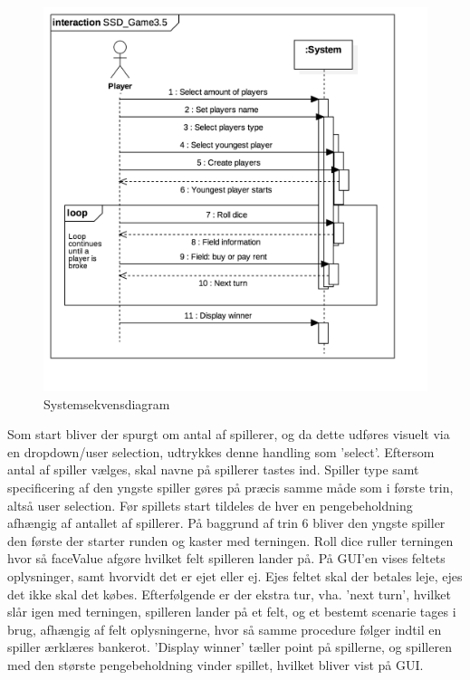 \begin{figure}[H]
    \begin{center}
        \includegraphics[width=13cm]{graphics/domain/SSD_Game3nw.png}
        \caption{Systemsekvensdiagram}
        \label{fig:systemsekvens_diagram}
    \end{center}
\end{figure}

\noindent Som start bliver der spurgt om antal af spillerer, og da dette udføres visuelt via en dropdown/user selection, udtrykkes denne handling som 'select'.
Eftersom antal af spiller vælges, skal navne på spillerer tastes ind.
Spiller type samt specificering af den yngste spiller gøres på præcis samme måde som i første trin, altså user selection.
Før spillets start tildeles de hver en pengebeholdning afhængig af antallet af spillerer.
På baggrund af trin 6 bliver den yngste spiller den første der starter runden og kaster med terningen.
Roll dice ruller terningen hvor så faceValue afgøre hvilket felt spilleren lander på.
På GUI'en vises feltets oplysninger, samt hvorvidt det er ejet eller ej. Ejes feltet skal der betales leje, ejes det ikke skal det købes.
Efterfølgende er der ekstra tur, vha. 'next turn', hvilket slår igen med terningen, spilleren lander på et felt, og et bestemt scenarie tages i brug, afhængig af felt oplysningerne, hvor så samme procedure følger indtil en spiller ærklæres bankerot.
'Display winner' tæller point på spillerne, og spilleren med den største pengebeholdning vinder spillet, hvilket bliver vist på GUI.\\

